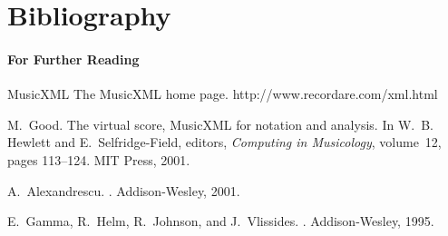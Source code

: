 \documentclass{beamer}
\begin{document}
\chapter{Bibliography}
\begin{frame}
  \frametitle{For Further Reading}

\begin{thebibliography}{Alexandrescu, 2001}

{\scriptsize

MusicXML
\newblock The MusicXML home page.
\newblock http://www.recordare.com/xml.html

M.~Good.
\newblock The virtual score, MusicXML for notation and analysis.
\newblock In W.~B. Hewlett and E.~Selfridge-Field, editors, {\em Computing in
  Musicology}, volume~12, pages 113--124. MIT Press, 2001.

A.~Alexandrescu.
.
\newblock Addison-Wesley, 2001.

E.~Gamma, R.~Helm, R.~Johnson, and J.~Vlissides.
.
\newblock Addison-Wesley, 1995.

}
\end{thebibliography}

\end{frame}
\end{document}
